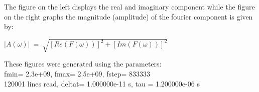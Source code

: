 \documentclass[11pt]{article}
\begin{document}
The figure on the left displays the real and imaginary component while the figure on the right graphs the magnitude 
(amplitude) of the fourier component is given by:
\begin{center}
 $\left | A(\omega) \right | ~=~ \sqrt{[Re(F(\omega))]^2 +
            [Im(F(\omega))]^2}$
\end{center}
These figures were generated using the parameters:\\
fmin= 2.3e+09, fmax= 2.5e+09, fstep= 833333\\
120001 lines read, deltat= 1.000000e-11 s, tau = 1.200000e-06 s
 ~\\
 ~\\
 ~\\
 ~\\
 ~\\
%
\end{document}
